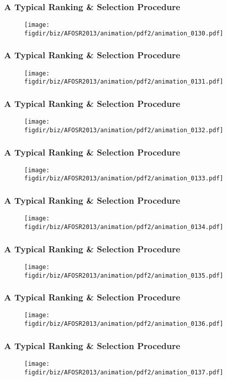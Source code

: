 \documentclass[13pt]{beamer}
\newcommand{\figdir}{../../fig}
\begin{document}
{\begin{frame}\frametitle{A Typical Ranking \& Selection Procedure}\begin{figure}\texttt{[image: \\figdir/biz/AFOSR2013/animation/pdf2/animation\_0130.pdf]}\end{figure}\end{frame}
\begin{frame}\frametitle{A Typical Ranking \& Selection Procedure}\begin{figure}\texttt{[image: \\figdir/biz/AFOSR2013/animation/pdf2/animation\_0131.pdf]}\end{figure}\end{frame}
\begin{frame}\frametitle{A Typical Ranking \& Selection Procedure}\begin{figure}\texttt{[image: \\figdir/biz/AFOSR2013/animation/pdf2/animation\_0132.pdf]}\end{figure}\end{frame}
\begin{frame}\frametitle{A Typical Ranking \& Selection Procedure}\begin{figure}\texttt{[image: \\figdir/biz/AFOSR2013/animation/pdf2/animation\_0133.pdf]}\end{figure}\end{frame}
\begin{frame}\frametitle{A Typical Ranking \& Selection Procedure}\begin{figure}\texttt{[image: \\figdir/biz/AFOSR2013/animation/pdf2/animation\_0134.pdf]}\end{figure}\end{frame}
\begin{frame}\frametitle{A Typical Ranking \& Selection Procedure}\begin{figure}\texttt{[image: \\figdir/biz/AFOSR2013/animation/pdf2/animation\_0135.pdf]}\end{figure}\end{frame}
\begin{frame}\frametitle{A Typical Ranking \& Selection Procedure}\begin{figure}\texttt{[image: \\figdir/biz/AFOSR2013/animation/pdf2/animation\_0136.pdf]}\end{figure}\end{frame}
\begin{frame}\frametitle{A Typical Ranking \& Selection Procedure}\begin{figure}\texttt{[image: \\figdir/biz/AFOSR2013/animation/pdf2/animation\_0137.pdf]}\end{figure}\end{frame}
}
\end{document}
